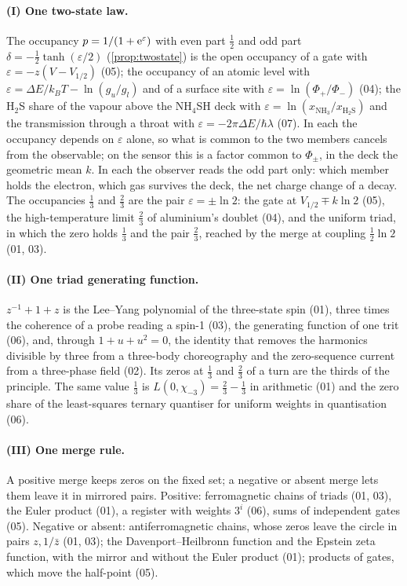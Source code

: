 \documentclass[11pt]{article}
\theoremstyle{definition}\newtheorem{definition}[theorem]{Definition}
\theoremstyle{remark}\newtheorem{remark}[theorem]{Remark}
\begin{document}
\paragraph{(I) One two-state law.} The occupancy $p=1/(1+\mathrm e^\varepsilon)$ with even part $\frac12$ and odd part $\delta=-\frac12\tanh(\varepsilon/2)$ (\cref{prop:twostate}) is the open occupancy of a gate with $\varepsilon=-z(V-V_{1/2})$ (05); the occupancy of an atomic level with $\varepsilon=\Delta E/k_BT-\ln(g_u/g_l)$ and of a surface site with $\varepsilon=\ln(\Phi_+/\Phi_-)$ (04); the H$_2$S share of the vapour above the NH$_4$SH deck with $\varepsilon=\ln(x_{\mathrm{NH_3}}/x_{\mathrm{H_2S}})$ and the transmission through a throat with $\varepsilon=-2\pi\Delta E/\hbar\lambda$ (07). In each the occupancy depends on $\varepsilon$ alone, so what is common to the two members cancels from the observable; on the sensor this is a factor common to $\Phi_\pm$, in the deck the geometric mean $k$. In each the observer reads the odd part only: which member holds the electron, which gas survives the deck, the net charge change of a decay. The occupancies $\frac13$ and $\frac23$ are the pair $\varepsilon=\pm\ln2$: the gate at $V_{1/2}\mp k\ln2$ (05), the high-temperature limit $\frac23$ of aluminium's doublet (04), and the uniform triad, in which the zero holds $\frac13$ and the pair $\frac23$, reached by the merge at coupling $\frac12\ln2$ (01, 03).

\paragraph{(II) One triad generating function.} $z^{-1}+1+z$ is the Lee--Yang polynomial of the three-state spin (01), three times the coherence of a probe reading a spin-1 (03), the generating function of one trit (06), and, through $1+u+u^2=0$, the identity that removes the harmonics divisible by three from a three-body choreography and the zero-sequence current from a three-phase field (02). Its zeros at $\frac13$ and $\frac23$ of a turn are the thirds of the principle. The same value $\frac13$ is $L(0,\chi_{-3})=\frac23-\frac13$ in arithmetic (01) and the zero share of the least-squares ternary quantiser for uniform weights in quantisation (06).

\paragraph{(III) One merge rule.} A positive merge keeps zeros on the fixed set; a negative or absent merge lets them leave it in mirrored pairs. Positive: ferromagnetic chains of triads (01, 03), the Euler product (01), a register with weights $3^i$ (06), sums of independent gates (05). Negative or absent: antiferromagnetic chains, whose zeros leave the circle in pairs $z,1/\bar z$ (01, 03); the Davenport--Heilbronn function and the Epstein zeta function, with the mirror and without the Euler product (01); products of gates, which move the half-point (05).
\end{document}
